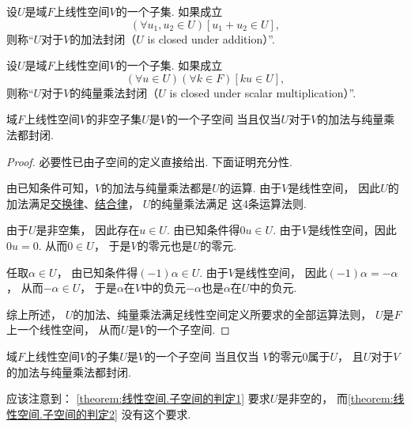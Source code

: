 \begin{definition}
设\(U\)是域\(F\)上线性空间\(V\)的一个子集.
如果成立\begin{equation*}
	(\forall u_1,u_2\in U)[u_1+u_2 \in U],
\end{equation*}
则称“\(U\)对于\(V\)的加法封闭（\(U\) is closed under addition）”.
\end{definition}
\begin{definition}
设\(U\)是域\(F\)上线性空间\(V\)的一个子集.
如果成立\begin{equation*}
	(\forall u\in U)(\forall k\in F)[ku\in U],
\end{equation*}
则称“\(U\)对于\(V\)的纯量乘法封闭（\(U\) is closed under scalar multiplication）”.
\end{definition}

\begin{theorem}\label{theorem:线性空间.子空间的判定1}
域\(F\)上线性空间\(V\)的非空子集\(U\)是\(V\)的一个子空间
当且仅当\(U\)对于\(V\)的加法与纯量乘法都封闭.
\begin{proof}
必要性已由子空间的定义直接给出.
下面证明充分性.

由已知条件可知，\(V\)的加法与纯量乘法都是\(U\)的运算.
由于\(V\)是线性空间，
因此\(U\)的加法满足\hyperref[definition:线性空间.运算法则1]{交换律}、\hyperref[definition:线性空间.运算法则2]{结合律}，
\(U\)的纯量乘法满足  这4条运算法则.

由于\(U\)是非空集，
因此存在\(u \in U\).
由已知条件得\(0 u \in U\).
由于\(V\)是线性空间，因此\(0 u = 0\).
从而\(0 \in U\)，
于是\(V\)的零元也是\(U\)的零元.

任取\(\alpha \in U\)，
由已知条件得\((-1) \alpha \in U\).
由于\(V\)是线性空间，
因此\((-1) \alpha = -\alpha\)，
从而\(-\alpha \in U\)，
于是\(\alpha\)在\(V\)中的负元\(-\alpha\)也是\(\alpha\)在\(U\)中的负元.

综上所述，
\(U\)的加法、纯量乘法满足线性空间定义所要求的全部运算法则，
\(U\)是\(F\)上一个线性空间，
从而\(U\)是\(V\)的一个子空间.
\end{proof}
\end{theorem}
\begin{theorem}\label{theorem:线性空间.子空间的判定2}
域\(F\)上线性空间\(V\)的子集\(U\)是\(V\)的一个子空间
当且仅当
\(V\)的零元\(0\)属于\(U\)，
且\(U\)对于\(V\)的加法与纯量乘法都封闭.
\end{theorem}
\begin{remark}
应该注意到：
\cref{theorem:线性空间.子空间的判定1} 要求\(U\)是非空的，
而\cref{theorem:线性空间.子空间的判定2} 没有这个要求.
\end{remark}

